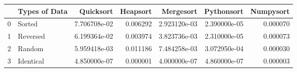 \begin{tabular}{llrrrrr}
\toprule
{} & Types of Data &     Quicksort &  Heapsort &     Mergesort &    Pythonsort &  Numpysort \\
\midrule
0 &        Sorted &  7.706708e-02 &  0.006292 &  2.923120e-03 &  2.390000e-05 &   0.000070 \\
1 &      Reversed &  6.199364e-02 &  0.003974 &  3.823736e-03 &  2.310000e-05 &   0.000073 \\
2 &        Random &  5.959418e-03 &  0.011186 &  7.484258e-03 &  3.072950e-04 &   0.000030 \\
3 &     Identical &  4.850000e-07 &  0.000001 &  4.000000e-07 &  4.860000e-07 &   0.000003 \\
\bottomrule
\end{tabular}
